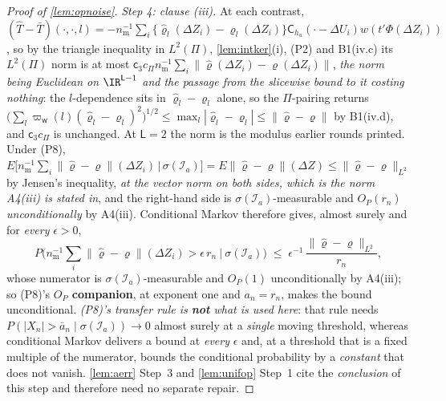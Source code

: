 \begin{proof}[Proof of \cref{lem:opnoise}]
\emph{Step 4: clause (iii).} At each contrast,
$(\hat T-\bar T)(\cdot,\cdot,l)=-n_{\mathrm m}^{-1}\sum_i\{\hat\varrho_l(\Delta Z_i)-\varrho_l(\Delta Z_i)\}
\mathsf C_{h_u}(\cdot-\Delta U_i)w(t'\Phi(\Delta Z_i))$, so by the triangle inequality in $L^{2}(\Pi)$,
\cref{lem:intker}(i), (P2) and B1(iv.c)
its $L^{2}(\Pi)$ norm is at most $\mathsf c_3c_\Pi n_{\mathrm m}^{-1}\sum_i\|\hat\varrho(\Delta Z_i)-\varrho(\Delta Z_i)\|$,
\emph{the norm being Euclidean on $\IR^{\mathsf L-1}$ and the passage from the slicewise bound to it
costing nothing}: the $l$-dependence sits in $\hat\varrho_l-\varrho_l$ alone, so the $\Pi$-pairing
returns $\big(\sum_l\varpi_{\mathsf w}(l)(\hat\varrho_l-\varrho_l)^{2}\big)^{1/2}
\le\max_l|\hat\varrho_l-\varrho_l|\le\|\hat\varrho-\varrho\|$ by B1(iv.d), and $\mathsf c_3c_\Pi$ is
unchanged. At $\mathsf L=2$ the norm is the modulus earlier rounds printed.
Under (P8), $E\big[n_{\mathrm m}^{-1}\sum_i\|\hat\varrho-\varrho\|(\Delta Z_i)\,\big|\,\sigma(\mathcal I_a)\big]
=E\|\hat\varrho-\varrho\|(\Delta Z)\le\|\hat\varrho-\varrho\|_{L^{2}}$ by Jensen's inequality, \emph{at
the vector norm on both sides, which is the norm A4(iii) is stated in}, and the
right-hand side is $\sigma(\mathcal I_a)$-measurable and $O_P(r_n)$ \emph{unconditionally} by A4(iii).
Conditional Markov therefore gives, almost surely and for \emph{every} $\epsilon>0$,
\[
P\Big(n_{\mathrm m}^{-1}\sum_i\|\hat\varrho-\varrho\|(\Delta Z_i)>\epsilon\,r_n
\ \Big|\ \sigma(\mathcal I_a)\Big)
\;\le\;\epsilon^{-1}\,\frac{\|\hat\varrho-\varrho\|_{L^{2}}}{r_n} ,
\]
whose numerator is $\sigma(\mathcal I_a)$-measurable and $O_P(1)$ unconditionally by A4(iii); so
\textup{(P8)}'s \textbf{$O_P$ companion}, at exponent one and $a_n=r_n$, makes the bound unconditional.
\emph{\textup{(P8)}'s \emph{transfer rule} is \textbf{not} what is used here}: that rule needs
$P(|X_n|>\bar a_n\mid\sigma(\mathcal I_a))\to0$ almost surely at a \emph{single} moving threshold, whereas
conditional Markov delivers a bound at \emph{every} $\epsilon$ and, at a threshold that is a fixed
multiple of the numerator, bounds the conditional probability by a \emph{constant} that does not vanish.
\cref{lem:aerr} Step~3 and
\cref{lem:unifop} Step~1 cite the \emph{conclusion} of this step and therefore need no separate repair.


\end{proof}

